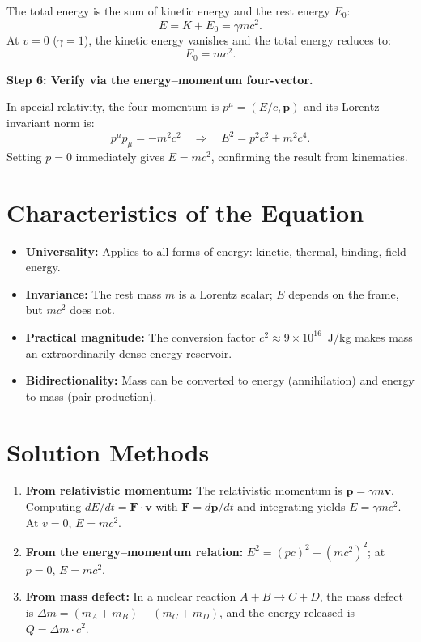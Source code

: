 The total energy is the sum of kinetic energy and the rest energy $E_{0}$:
\begin{equation}
E = K + E_{0} = \gamma mc^{2}.
\end{equation}
At $v = 0$ ($\gamma = 1$), the kinetic energy vanishes and the total energy reduces to:
\begin{equation}
\boxed{E_{0} = mc^{2}.}
\end{equation}

\textbf{Step 6: Verify via the energy--momentum four-vector.}

In special relativity, the four-momentum is $p^{\mu} = (E/c, \mathbf{p})$ and its Lorentz-invariant norm is:
\begin{equation}
p^{\mu}p_{\mu} = -m^{2}c^{2} \quad\Longrightarrow\quad E^{2} = p^{2}c^{2} + m^{2}c^{4}.
\end{equation}
Setting $p = 0$ immediately gives $E = mc^{2}$, confirming the result from kinematics.

\section*{Characteristics of the Equation}

\begin{itemize}
  \item \textbf{Universality:} Applies to all forms of energy: kinetic, thermal, binding, field energy.
  \item \textbf{Invariance:} The rest mass $m$ is a Lorentz scalar; $E$ depends on the frame, but $mc^{2}$ does not.
  \item \textbf{Practical magnitude:} The conversion factor $c^{2} \approx 9 \times 10^{16}$~J/kg makes mass an extraordinarily dense energy reservoir.
  \item \textbf{Bidirectionality:} Mass can be converted to energy (annihilation) and energy to mass (pair production).
\end{itemize}
\section*{Solution Methods}

\begin{enumerate}
  \item \textbf{From relativistic momentum:} The relativistic momentum is $\mathbf{p} = \gamma m\mathbf{v}$. Computing $dE/dt = \mathbf{F}\cdot\mathbf{v}$ with $\mathbf{F} = d\mathbf{p}/dt$ and integrating yields $E = \gamma mc^{2}$. At $v = 0$, $E = mc^{2}$.
  \item \textbf{From the energy--momentum relation:} $E^{2} = (pc)^{2} + (mc^{2})^{2}$; at $p = 0$, $E = mc^{2}$.
  \item \textbf{From mass defect:} In a nuclear reaction $A + B \to C + D$, the mass defect is $\Delta m = (m_{A} + m_{B}) - (m_{C} + m_{D})$, and the energy released is $Q = \Delta m \cdot c^{2}$.
\end{enumerate}

